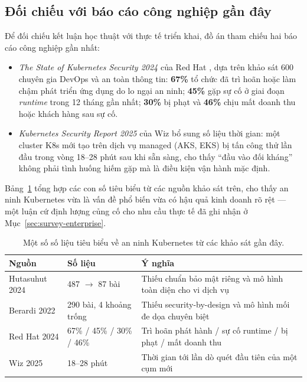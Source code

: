 \subsection{Đối chiếu với báo cáo công nghiệp gần đây}

Để đối chiếu kết luận học thuật với thực tế triển khai, đồ án tham chiếu hai báo cáo công nghiệp gần nhất:

\begin{itemize}
  \item \textit{The State of Kubernetes Security 2024} của Red Hat \cite{redhat2024k8ssec}, dựa trên khảo sát 600 chuyên gia DevOps và an toàn thông tin: \textbf{67\%} tổ chức đã trì hoãn hoặc làm chậm phát triển ứng dụng do lo ngại an ninh; \textbf{45\%} gặp sự cố ở giai đoạn \textit{runtime} trong 12 tháng gần nhất; \textbf{30\%} bị phạt và \textbf{46\%} chịu mất doanh thu hoặc khách hàng sau sự cố.
  \item \textit{Kubernetes Security Report 2025} của Wiz \cite{wiz2025k8ssec} bổ sung số liệu thời gian: một cluster K8s mới tạo trên dịch vụ managed (AKS, EKS) bị tấn công thử lần đầu trong vòng 18--28 phút sau khi sẵn sàng, cho thấy ``đầu vào đối kháng'' không phải tình huống hiếm gặp mà là điều kiện vận hành mặc định.
\end{itemize}

Bảng~\ref{tab:survey-data} tổng hợp các con số tiêu biểu từ các nguồn khảo sát trên,
cho thấy an ninh Kubernetes vừa là vấn đề phổ biến vừa có hậu quả kinh doanh rõ rệt --- một
luận cứ định lượng củng cố cho nhu cầu thực tế đã ghi nhận ở
Mục~\ref{sec:survey-enterprise}.

\begin{table}[H]
  \centering
  \caption{Một số số liệu tiêu biểu về an ninh Kubernetes từ các khảo sát gần đây.}
  \label{tab:survey-data}
  \small
  \begin{tabularx}{\linewidth}{@{}l l X@{}}
    \toprule
    \textbf{Nguồn} & \textbf{Số liệu} & \textbf{Ý nghĩa} \\
    \midrule
    Hutasuhut 2024 \cite{hutasuhut2024gap} & 487 $\rightarrow$ 87 bài & Thiếu chuẩn bảo mật riêng và mô hình toàn diện cho vi dịch vụ \\
    Berardi 2022 \cite{berardi2022microservice} & 290 bài, 4 khoảng trống & Thiếu security-by-design và mô hình mối đe dọa chuyên biệt \\
    Red Hat 2024 \cite{redhat2024k8ssec} & 67\% / 45\% / 30\% / 46\% & Trì hoãn phát hành / sự cố runtime / bị phạt / mất doanh thu \\
    Wiz 2025 \cite{wiz2025k8ssec} & 18--28 phút & Thời gian tới lần dò quét đầu tiên của một cụm mới \\
    \bottomrule
  \end{tabularx}
\end{table}

